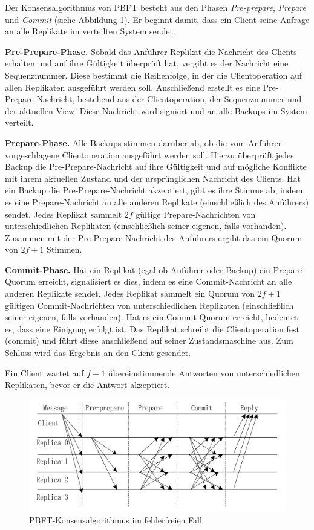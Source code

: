 \documentclass[nonacm,sigconf,natbib=false]{acmart}
\begin{document}
Der Konsensalgorithmus von PBFT besteht aus den Phasen \emph{Pre-prepare}, \emph{Prepare} und \emph{Commit} (siehe Abbildung \ref{fig:pbft-normal}). Er beginnt damit, dass ein Client seine Anfrage an alle Replikate im verteilten System sendet.

\textbf{Pre-Prepare-Phase.} Sobald das Anführer-Replikat die Nachricht des Clients erhalten und auf ihre Gültigkeit überprüft hat, vergibt es der Nachricht eine Sequenznummer. Diese bestimmt die Reihenfolge, in der die Clientoperation auf allen Replikaten ausgeführt werden soll. Anschließend erstellt es eine Pre-Prepare-Nachricht, bestehend aus der Clientoperation, der Sequenznummer und der aktuellen View. Diese Nachricht wird signiert und an alle Backups im System verteilt.

\textbf{Prepare-Phase.} Alle Backups stimmen darüber ab, ob die vom Anführer vorgeschlagene Clientoperation ausgeführt werden soll. Hierzu überprüft jedes Backup die Pre-Prepare-Nachricht auf ihre Gültigkeit und auf mögliche Konflikte mit ihrem aktuellen Zustand und der ursprünglichen Nachricht des Clients. Hat ein Backup die Pre-Prepare-Nachricht akzeptiert, gibt es ihre Stimme ab, indem es eine Prepare-Nachricht an alle anderen Replikate (einschließlich des Anführers) sendet. Jedes Replikat sammelt $2f$ gültige Prepare-Nachrichten von unterschiedlichen Replikaten (einschließlich seiner eigenen, falls vorhanden). Zusammen mit der Pre-Prepare-Nachricht des Anführers ergibt das ein Quorum von $2f+1$ Stimmen.

\textbf{Commit-Phase.} Hat ein Replikat (egal ob Anführer oder Backup) ein Prepare-Quorum erreicht, signalisiert es dies, indem es eine Commit-Nachricht an alle anderen Replikate sendet. Jedes Replikat sammelt ein Quorum von $2f+1$ gültigen Commit-Nachrichten von unterschiedlichen Replikaten (einschließlich seiner eigenen, falls vorhanden). Hat es ein Commit-Quorum erreicht, bedeutet es, dass eine Einigung erfolgt ist. Das Replikat schreibt die Clientoperation fest (commit) und führt diese anschließend auf seiner Zustandsmaschine aus. Zum Schluss wird das Ergebnis an den Client gesendet.

Ein Client wartet auf $f+1$ übereinstimmende Antworten von unterschiedlichen Replikaten, bevor er die Antwort akzeptiert.

\begin{figure}
  \centering
  \includegraphics[width=\linewidth]{pbft-normal.png}
  \caption{PBFT-Konsensalgorithmus im fehlerfreien Fall}
  \label{fig:pbft-normal}
\end{figure}
\end{document}
